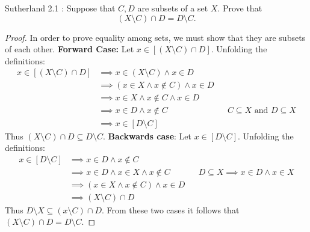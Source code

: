 \documentclass{homework}
\begin{document}
\begin{problems}

\problem Sutherland 2.1 :
Suppose that $C, D$ are subsets of a set $X$. Prove that
\[
(X \setminus C) \cap D = D \setminus C.
\]
\solution
  \begin{proof}
$ $\newline In order to prove equality among sets, we must show that they are subsets of each other. 
    \textbf{Forward Case:} Let $x \in [(X \setminus C) \cap D]$. Unfolding the definitions:
    \begin{align*}
      x \in [( X \setminus C) \cap D] & \implies x \in (X \setminus C) \land x \in D \\
      & \implies (x \in X \land x \notin C) \land x \in D \\
      & \implies  x \in X \land x \notin C \land x \in D \\
      & \implies x \in D \land x \notin C && \text{$C \subseteq X$ and $D \subseteq X$}\\
      & \implies x \in [D \setminus C]
    \end{align*}
    Thus $(X \setminus C) \cap D \subseteq D \setminus C$. \newline
    \textbf{Backwards case}: Let $x \in [D \setminus C]$. Unfolding the definitions:
      \begin{align*}
        x \in [D \setminus C] &\implies x \in D \land x \notin C \\
        &\implies x \in D \land x \in X \land x \notin C && \text{$D \subseteq X \implies x \in D \land x \in X$}\\
        &\implies (x \in X \land x \notin C ) \land x \in D \\
        &\implies (X \setminus C) \cap D
      \end{align*}
      Thus $D \setminus X \subseteq (x \setminus C) \cap D$.
      From these two cases it follows that $(X \setminus C) \cap D = D \setminus C$.
\end{proof}


\end{problems}
\end{document}
